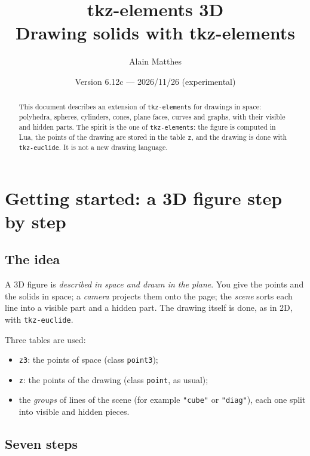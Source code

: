 \documentclass[11pt]{article}
\title{tkz-elements 3D\\[4pt]\large Drawing solids with tkz-elements}
\author{Alain Matthes}
\date{Version 6.12c --- 2026/11/26 (experimental)}
\newcommand\code[1]{\texttt{#1}}
\begin{document}
\maketitle
\begin{abstract}
This document describes an extension of \code{tkz-elements} for drawings in
space: polyhedra, spheres, cylinders, cones, plane faces, curves and graphs,
with their visible and hidden parts. The spirit is the one of
\code{tkz-elements}: the figure is computed in Lua, the points of the drawing
are stored in the table \code{z}, and the drawing is done with
\code{tkz-euclide}. It is not a new drawing language.
\end{abstract}
\tableofcontents
\clearpage

\section{Getting started: a 3D figure step by step}
\label{sec:getting_started}

\subsection{The idea}

A 3D figure is \emph{described in space and drawn in the plane}. You give
the points and the solids in space; a \emph{camera} projects them onto the
page; the \emph{scene} sorts each line into a visible part and a hidden part.
The drawing itself is done, as in 2D, with \code{tkz-euclide}.

Three tables are used:
\begin{itemize}
  \item \code{z3}: the points of space (class \code{point3});
  \item \code{z}: the points of the drawing (class \code{point}, as usual);
  \item the \emph{groups} of lines of the scene (for example \code{"cube"} or
        \code{"diag"}), each one split into visible and hidden pieces.
\end{itemize}

\subsection{Seven steps}
\end{document}
